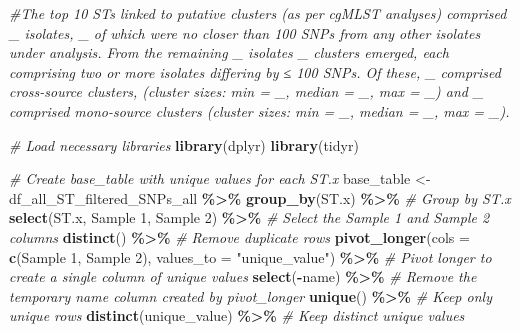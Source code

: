 \documentclass[
]{article}
\newenvironment{Shaded}{\begin{snugshade}}{\end{snugshade}}
\newcommand{\AttributeTok}[1]{\textcolor[rgb]{0.13,0.29,0.53}{#1}}
\newcommand{\CommentTok}[1]{\textcolor[rgb]{0.56,0.35,0.01}{\textit{#1}}}
\newcommand{\FunctionTok}[1]{\textcolor[rgb]{0.13,0.29,0.53}{\textbf{#1}}}
\newcommand{\NormalTok}[1]{#1}
\newcommand{\OtherTok}[1]{\textcolor[rgb]{0.56,0.35,0.01}{#1}}
\newcommand{\SpecialCharTok}[1]{\textcolor[rgb]{0.81,0.36,0.00}{\textbf{#1}}}
\newcommand{\StringTok}[1]{\textcolor[rgb]{0.31,0.60,0.02}{#1}}
\begin{document}
\begin{Shaded}
\begin{Highlighting}[]
\CommentTok{\#The top 10 STs linked to putative clusters (as per cgMLST analyses) comprised \_ isolates, \_ of which were no closer than 100 SNPs from any other isolates under analysis. From the remaining \_ isolates \_ clusters emerged, each comprising two or more isolates differing by ≤ 100 SNPs. Of these, \_ comprised cross{-}source clusters, (cluster sizes: min = \_, median = \_, max = \_) and \_ comprised mono{-}source clusters (cluster sizes: min = \_, median = \_, max = \_). }

\CommentTok{\# Load necessary libraries}
\FunctionTok{library}\NormalTok{(dplyr)}
\FunctionTok{library}\NormalTok{(tidyr)}

\CommentTok{\# Create base\_table with unique values for each ST.x}
\NormalTok{base\_table }\OtherTok{\textless{}{-}}\NormalTok{ df\_all\_ST\_filtered\_SNPs\_all }\SpecialCharTok{\%\textgreater{}\%}
  \FunctionTok{group\_by}\NormalTok{(ST.x) }\SpecialCharTok{\%\textgreater{}\%}                            \CommentTok{\# Group by ST.x}
  \FunctionTok{select}\NormalTok{(ST.x, }\StringTok{\textasciigrave{}}\AttributeTok{Sample 1}\StringTok{\textasciigrave{}}\NormalTok{, }\StringTok{\textasciigrave{}}\AttributeTok{Sample 2}\StringTok{\textasciigrave{}}\NormalTok{) }\SpecialCharTok{\%\textgreater{}\%}            \CommentTok{\# Select the Sample 1 and Sample 2 columns}
  \FunctionTok{distinct}\NormalTok{() }\SpecialCharTok{\%\textgreater{}\%}                                \CommentTok{\# Remove duplicate rows}
  \FunctionTok{pivot\_longer}\NormalTok{(}\AttributeTok{cols =} \FunctionTok{c}\NormalTok{(}\StringTok{\textasciigrave{}}\AttributeTok{Sample 1}\StringTok{\textasciigrave{}}\NormalTok{, }\StringTok{\textasciigrave{}}\AttributeTok{Sample 2}\StringTok{\textasciigrave{}}\NormalTok{), }\AttributeTok{values\_to =} \StringTok{"unique\_value"}\NormalTok{) }\SpecialCharTok{\%\textgreater{}\%} \CommentTok{\# Pivot longer to create a single column of unique values}
  \FunctionTok{select}\NormalTok{(}\SpecialCharTok{{-}}\NormalTok{name) }\SpecialCharTok{\%\textgreater{}\%}                             \CommentTok{\# Remove the temporary \textquotesingle{}name\textquotesingle{} column created by pivot\_longer}
  \FunctionTok{unique}\NormalTok{() }\SpecialCharTok{\%\textgreater{}\%}                                  \CommentTok{\# Keep only unique rows}
  \FunctionTok{distinct}\NormalTok{(unique\_value) }\SpecialCharTok{\%\textgreater{}\%}                    \CommentTok{\# Keep distinct unique values}

\end{Highlighting}
\end{Shaded}
\end{document}
